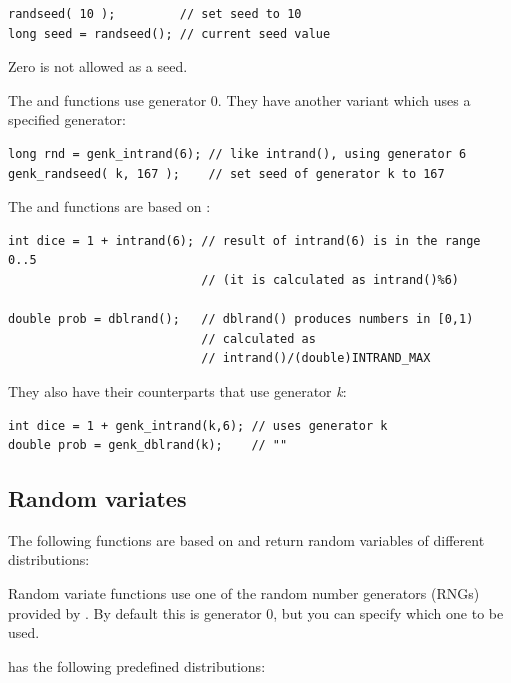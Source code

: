 \begin{verbatim}
randseed( 10 );         // set seed to 10
long seed = randseed(); // current seed value
\end{verbatim}

Zero is not allowed as a seed.

The  and  functions use generator 0. They have
another variant which uses a specified generator:

\begin{verbatim}
long rnd = genk_intrand(6); // like intrand(), using generator 6
genk_randseed( k, 167 );    // set seed of generator k to 167
\end{verbatim}


The  and  functions are based on :

\begin{verbatim}
int dice = 1 + intrand(6); // result of intrand(6) is in the range 0..5
                           // (it is calculated as intrand()%6)

double prob = dblrand();   // dblrand() produces numbers in [0,1)
                           // calculated as
                           // intrand()/(double)INTRAND_MAX
\end{verbatim}


They also have their counterparts that use generator \textit{k}:

\begin{verbatim}
int dice = 1 + genk_intrand(k,6); // uses generator k
double prob = genk_dblrand(k);    // ""
\end{verbatim}




\subsection{Random variates}

The following functions are based on  and return
random variables of different distributions:

Random variate functions use one of the random number generators (RNGs)
provided by \opp. By default this is generator 0, but you can specify
which one to be used.

{\opp} has the following predefined distributions:

